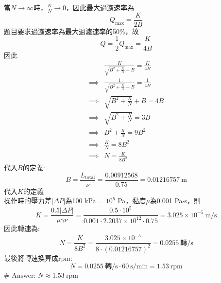 \documentclass[12pt,a4paper]{article}
\begin{document}
\begin{problems}
\begin{enumerate}
    當$N\to\infty$時，$\frac{K}{N}\to 0$，因此最大過濾速率為
    \begin{equation}
      Q_{\max} = \frac{K}{2B}
    \end{equation}
    題目要求過濾速率為最大過濾速率的50\%，故
    \begin{equation}
      Q = \frac{1}{2}Q_{\max} = \frac{K}{4B}
    \end{equation}
    因此
    \begin{align}
      &\frac{K}{\sqrt{B^2+\frac{K}{N}}+B} = \frac{K}{4B} \nonumber\\
      \implies & \frac{1}{\sqrt{B^2+\frac{K}{N}}+B} = \frac{1}{4B} \nonumber\\
      \implies & \sqrt{B^2+\frac{K}{N}}+B = 4B \nonumber\\
      \implies & \sqrt{B^2+\frac{K}{N}} = 3B \nonumber\\
      \implies & B^2+\frac{K}{N} = 9B^2 \nonumber\\
      \implies & \frac{K}{N} = 8B^2 \nonumber\\
      \implies & N = \frac{K}{8B^2}
    \end{align}
    代入$B$的定義:
    \begin{equation}
      B = \frac{L_{\text{total}}}{\nu} = \frac{0.00912568}{0.75} = 0.01216757~\text{m}
    \end{equation}
    代入$K$的定義\\
    操作時的壓力差$\left|\Delta P\right|$為100 kPa = $10^5$ Pa，黏度$\mu$為0.001 Pa$\cdot$s，則
    \begin{equation}
      K = \frac{0.5\left|\Delta P\right|}{\mu\gamma\nu} = 
      \frac{0.5\cdot 10^5}{0.001\cdot 2.2037\times10^{12}\cdot 0.75} = 3.025\times10^{-5}~\text{m/s}
    \end{equation}
    因此轉速為:
    \begin{equation}
      N = \frac{K}{8B^2} = \frac{3.025\times10^{-5}}{8\cdot (0.01216757)^2} = 0.0255~\text{轉/s}
    \end{equation}
    最後將轉速換算成rpm:
    \begin{equation}
      N = 0.0255~\text{轉/s} \cdot 60~\text{s/min} = 1.53~\text{rpm}
    \end{equation}
    \# Answer: \underline{$N\approx 1.53~\text{rpm}$}
\end{enumerate}
\end{problems}
\end{document}

